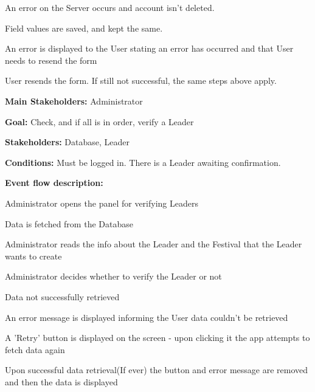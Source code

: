 \begin{packed_item}
\begin{packed_item}
						\item[7.a] An error on the Server occurs and account isn't deleted.
						\item[] \begin{packed_enum}
							\item Field values are saved, and kept the same.
							\item An error is displayed to the User stating an error has occurred and that User needs to resend the form
							\item User resends the form. If still not successful, the same steps above apply.
						\end{packed_enum}
						
					\end{packed_item}
					
				\end{packed_item}
			
				\noindent {}
				\begin{packed_item}
					\item \textbf{Main Stakeholders:} Administrator
					\item \textbf{Goal:} Check, and if all is in order, verify a Leader
					\item \textbf{Stakeholders:} Database, Leader
					\item \textbf{Conditions:} Must be logged in. There is a Leader awaiting confirmation.
					\item \textbf{Event flow description: }
					\begin{packed_enum}
						\item Administrator opens the panel for verifying Leaders
						\item Data is fetched from the Database
						\item Administrator reads the info about the Leader and the Festival that the Leader wants to create
						\item Administrator decides whether to verify the Leader or not
					\end{packed_enum}
					
					\begin{packed_item}
						\item[2.a] Data not successfully retrieved
						\item[] \begin{packed_enum}
							\item An error message is displayed informing the User data couldn't be retrieved
							\item A 'Retry' button is displayed on the screen - upon clicking it the app attempts to fetch data again
							\item Upon successful data retrieval(If ever) the button and error message are removed and then the data is displayed
						\end{packed_enum}
					\end{packed_item}
				\end{packed_item}
			

